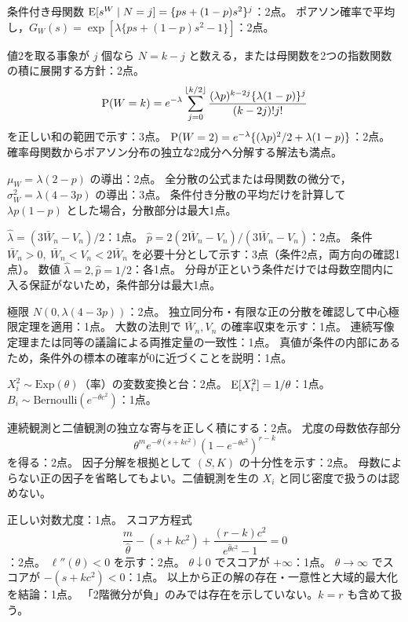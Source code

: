 \documentclass[a4paper,11pt]{ltjsarticle}
\begin{document}
条件付き母関数 $\operatorname{E}[s^W\mid N=j]=\{ps+(1-p)s^2\}^j$：2点。
ポアソン確率で平均し，$G_W(s)=\exp[\lambda\{ps+(1-p)s^2-1\}]$：2点。

値2を取る事象が $j$ 個なら $N=k-j$ と数える，または母関数を2つの指数関数の積に展開する方針：2点。
\[
\operatorname{P}(W=k)=e^{-\lambda}\sum_{j=0}^{\lfloor k/2\rfloor}
\frac{(\lambda p)^{k-2j}\{\lambda(1-p)\}^{j}}{(k-2j)!j!}
\]
を正しい和の範囲で示す：3点。
$\operatorname{P}(W=2)=e^{-\lambda}\{(\lambda p)^2/2+\lambda(1-p)\}$：2点。
確率母関数からポアソン分布の独立な2成分へ分解する解法も満点。

$\mu_W=\lambda(2-p)$ の導出：2点。
全分散の公式または母関数の微分で，$\sigma_W^2=\lambda(4-3p)$ の導出：3点。
条件付き分散の平均だけを計算して $\lambda p(1-p)$ とした場合，分散部分は最大1点。

$\hat\lambda=(3\bar W_n-V_n)/2$：1点。
$\hat p=2(2\bar W_n-V_n)/(3\bar W_n-V_n)$：2点。
条件 $\bar W_n>0,\ \bar W_n<V_n<2\bar W_n$ を必要十分として示す：3点（条件2点，両方向の確認1点）。
数値 $\hat\lambda=2,\hat p=1/2$：各1点。
分母が正という条件だけでは母数空間内に入る保証がないため，条件部分は最大1点。

極限 $N(0,\lambda(4-3p))$：2点。
独立同分布・有限な正の分散を確認して中心極限定理を適用：1点。
大数の法則で $\bar W_n,V_n$ の確率収束を示す：1点。
連続写像定理または同等の議論による両推定量の一致性：1点。
真値が条件の内部にあるため，条件外の標本の確率が0に近づくことを説明：1点。
\newpage

$X_i^2\sim\mathrm{Exp}(\theta)$（率）の変数変換と台：2点。
$\operatorname{E}[X_i^2]=1/\theta$：1点。
$B_i\sim\mathrm{Bernoulli}(e^{-\theta c^2})$：1点。

連続観測と二値観測の独立な寄与を正しく積にする：2点。
尤度の母数依存部分
\[
\theta^m e^{-\theta(s+kc^2)}(1-e^{-\theta c^2})^{r-k}
\]
を得る：2点。
因子分解を根拠として $(S,K)$ の十分性を示す：2点。
母数によらない正の因子を省略してもよい。二値観測を生の $X_i$ と同じ密度で扱うのは認めない。

正しい対数尤度：1点。
スコア方程式
\[
\frac m{\hat\theta}-(s+kc^2)+\frac{(r-k)c^2}{e^{\hat\theta c^2}-1}=0
\]
：2点。
$\ell''(\theta)<0$ を示す：2点。
$\theta\downarrow0$ でスコアが $+\infty$：1点。
$\theta\to\infty$ でスコアが $-(s+kc^2)<0$：1点。
以上から正の解の存在・一意性と大域的最大化を結論：1点。
「2階微分が負」のみでは存在を示していない。$k=r$ も含めて扱う。
\end{document}
